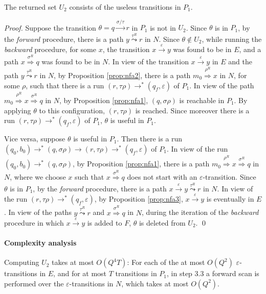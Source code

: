 \documentclass{llncs}
\newcommand{\eps}{\ensuremath{\varepsilon}}
\begin{document}
\begin{theorem}
\label{thm:nfa2}
The returned set $U_2$ consists of the useless transitions in $P_1$.
\end{theorem}

\begin{proof}
Suppose the transition $\theta=q\stackrel{\sigma/\tau}{\rightarrow}r$ in $P_1$ is not in $U_2$. Since $\theta$ is in $P_1$,
by the {\em forward} procedure, there is a path $y\stackrel{\tau^R}{\leadsto}r$ in $N$. Since $\theta\not\in U_2$, while running
the {\em backward} procedure, for some $x$, the transition $x\stackrel{\eps}{\rightarrow}y$ was found to be in $E$,
and a path $x\stackrel{\sigma^R}{\Rightarrow}q$ was found to be in $N$.
In view of the transition $x\stackrel{\eps}{\rightarrow}y$ in $E$ and the path $y\stackrel{\tau^R}{\leadsto}r$ in $N$,
by Proposition \ref{prop:nfa2}, there is a path $m_0\stackrel{\rho^R}{\Rightarrow}x$ in $N$, for some $\rho$,
such that there is a run $(r,\tau\rho)\rightarrow^*(q_f,\eps)$ of $P_1$.
In view of the path $m_0\stackrel{\rho^R}{\Rightarrow}x\stackrel{\sigma^R}{\Rightarrow}q$ in $N$,
by Proposition \ref{prop:nfa1}, $(q,\sigma\rho)$ is reachable in $P_1$.
By applying $\theta$ to this configuration, $(r,\tau\rho)$ is reached. Since moreover
there is a run $(r,\tau\rho)\rightarrow^*(q_f,\eps)$ of $P_1$, $\theta$ is useful in $P_1$.

Vice versa, suppose $\theta$ is useful in $P_1$. Then there is a run
$(q_0,b_0)\rightarrow^*(q,\sigma\rho)\rightarrow(r,\tau\rho)\rightarrow^*(q_f,\eps)$ of $P_1$.
In view of the run $(q_0,b_0)\rightarrow^*(q,\sigma\rho)$,
by Proposition \ref{prop:nfa1}, there is a path $m_0\stackrel{\rho^R}{\Rightarrow}x\stackrel{\sigma^R}{\Rightarrow}q$ in $N$,
where we choose $x$ such that $x\stackrel{\sigma^R}{\Rightarrow}q$ does not start with an $\eps$-transition.
Since $\theta$ is in $P_1$, by the {\em forward} procedure, there is a path $x\stackrel{\eps}{\rightarrow}y\stackrel{\tau^R}{\leadsto}r$ in $N$.
In view of the run $(r,\tau\rho)\rightarrow^*(q_f,\eps)$, by Proposition \ref{prop:nfa3}, $x\stackrel{\eps}{\rightarrow}y$ is eventually in $E$.
In view of the paths $y\stackrel{\tau^R}{\leadsto}r$ and $x\stackrel{\sigma^R}{\Rightarrow}q$ in $N$, during the iteration
of the {\em backward} procedure in which $x\stackrel{\eps}{\rightarrow}y$ is added to $F$, $\theta$ is deleted from $U_2$.
\qed
\end{proof}

\paragraph{Complexity analysis}
Computing $U_2$ takes at most $O(Q^4T)$:
For each of the at most $O(Q^2)$ $\eps$-transitions in $E$, and for at most $T$
transitions in $P_1$, in step 3.3 a forward scan is performed over the $\eps$-transitions in $N$, which takes at most $O(Q^2)$.
\end{document}
